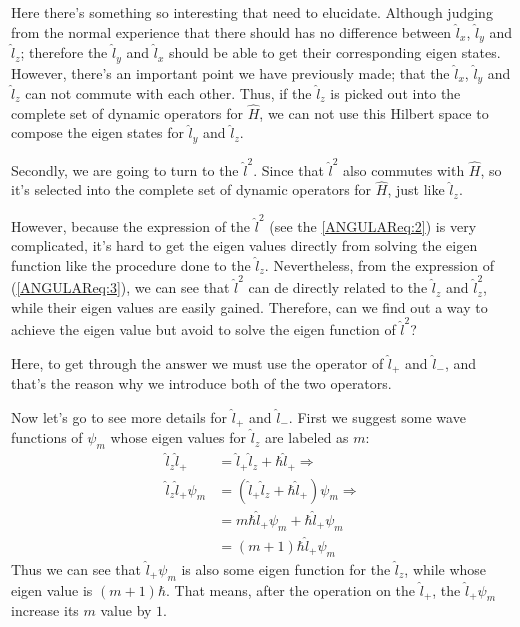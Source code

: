 Here there's something so interesting that need to elucidate.
Although judging from the normal experience that there should has no
difference between $\hat{l}_{x}$, $\hat{l}_{y}$ and $\hat{l}_{z}$;
therefore the $\hat{l}_{y}$ and $\hat{l}_{x}$ should be able to get
their corresponding eigen states. However, there's an important
point we have previously made; that the $\hat{l}_{x}$, $\hat{l}_{y}$
and $\hat{l}_{z}$ can not commute with each other. Thus, if the
$\hat{l}_{z}$ is picked out into the complete set of dynamic
operators for $\hat{H}$, we can not use this Hilbert space to
compose the eigen states for $\hat{l}_{y}$ and $\hat{l}_{z}$.

Secondly, we are going to turn to the $\hat{l}^{2}$. Since that
$\hat{l}^{2}$ also commutes with $\hat{H}$, so it's selected into
the complete set of dynamic operators for $\hat{H}$, just like
$\hat{l}_{z}$.

However, because the expression of the $\hat{l}^{2}$ (see the
\ref{ANGULAReq:2}) is very complicated, it's hard to get the eigen
values directly from solving the eigen function like the procedure
done to the $\hat{l}_{z}$. Nevertheless, from the expression of
(\ref{ANGULAReq:3}), we can see that $\hat{l}^{2}$ can de directly
related to the $\hat{l}_{z}$ and $\hat{l}_{z}^{2}$, while their
eigen values are easily gained. Therefore, can we find out a way to
achieve the eigen value but avoid to solve the eigen function of
$\hat{l}^{2}$?

Here, to get through the answer we must use the operator of
$\hat{l}_{+}$ and $\hat{l}_{-}$, and that's the reason why we
introduce both of the two operators.

Now let's go to see more details for $\hat{l}_{+}$ and
$\hat{l}_{-}$. First we suggest some wave functions of $\psi_{m}$
whose eigen values for $\hat{l}_{z}$ are labeled as $m$:
\begin{align}\label{}
\hat{l}_{z}\hat{l}_{+} &= \hat{l}_{+}\hat{l}_{z} + \hbar\hat{l}_{+}
\Rightarrow \nonumber \\
\hat{l}_{z}\hat{l}_{+}\psi_{m} &= (\hat{l}_{+}\hat{l}_{z} +
\hbar\hat{l}_{+})\psi_{m} \Rightarrow \nonumber \\
&=m\hbar\hat{l}_{+}\psi_{m} + \hbar\hat{l}_{+}\psi_{m} \nonumber \\
&=(m+1)\hbar\hat{l}_{+}\psi_{m}
\end{align}
Thus we can see that $\hat{l}_{+}\psi_{m}$ is also some eigen
function for the $\hat{l}_{z}$, while whose eigen value is
$(m+1)\hbar$. That means, after the operation on the $\hat{l}_{+}$,
the $\hat{l}_{+}\psi_{m}$ increase its $m$ value by $1$.


